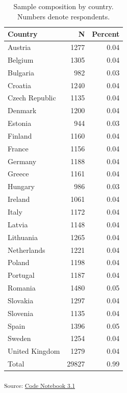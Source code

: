\documentclass[
  12pt,
  a4paper,
  DIV=11,
  numbers=noendperiod]{scrartcl}
\begin{document}
\begin{longtable}[]{@{}lrr@{}}

\caption{\label{tbl-nresp-country}Sample composition by country. Numbers
denote respondents.}

\tabularnewline

\toprule\noalign{}
Country & N & Percent \\
\midrule\noalign{}
\endhead
\bottomrule\noalign{}
\endlastfoot
Austria & 1277 & 0.04 \\
Belgium & 1305 & 0.04 \\
Bulgaria & 982 & 0.03 \\
Croatia & 1240 & 0.04 \\
Czech Republic & 1135 & 0.04 \\
Denmark & 1200 & 0.04 \\
Estonia & 944 & 0.03 \\
Finland & 1160 & 0.04 \\
France & 1156 & 0.04 \\
Germany & 1188 & 0.04 \\
Greece & 1161 & 0.04 \\
Hungary & 986 & 0.03 \\
Ireland & 1061 & 0.04 \\
Italy & 1172 & 0.04 \\
Latvia & 1148 & 0.04 \\
Lithuania & 1265 & 0.04 \\
Netherlands & 1221 & 0.04 \\
Poland & 1198 & 0.04 \\
Portugal & 1187 & 0.04 \\
Romania & 1480 & 0.05 \\
Slovakia & 1297 & 0.04 \\
Slovenia & 1135 & 0.04 \\
Spain & 1396 & 0.05 \\
Sweden & 1254 & 0.04 \\
United Kingdom & 1279 & 0.04 \\
Total & 29827 & 0.99 \\

\end{longtable}

\textsubscript{Source:
\href{https://LS-Konig.github.io/CSAP/code/03_explanal/3.1_descr_anal-preview.html\#cell-tbl-nresp-country}{Code
Notebook 3.1}}
\end{document}
